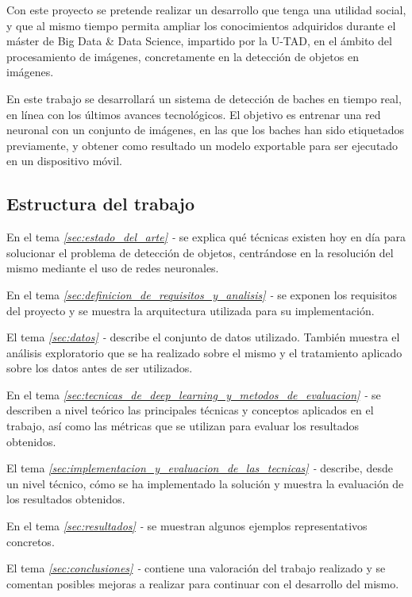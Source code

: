 Con este proyecto se pretende realizar un desarrollo que tenga una utilidad social, y que al mismo tiempo permita ampliar los conocimientos adquiridos durante el máster de Big Data \& Data Science, impartido por la U-TAD, en el ámbito del procesamiento de imágenes, concretamente en la detección de objetos en imágenes.

En este trabajo se desarrollará un sistema de detección de baches en tiempo real, en línea con los últimos avances tecnológicos. El objetivo es entrenar una red neuronal con un conjunto de imágenes, en las que los baches han sido etiquetados previamente, y obtener como resultado un modelo exportable para ser ejecutado en un dispositivo móvil.

\subsection{Estructura del trabajo}

En el tema \textit{\ref{sec:estado_del_arte} - } se explica qué técnicas existen hoy en día para solucionar el problema de detección de objetos, centrándose en la resolución del mismo mediante el uso de redes neuronales.

En el tema \textit{\ref{sec:definicion_de_requisitos_y_analisis} - } se exponen los requisitos del proyecto y se muestra la arquitectura utilizada para su implementación.

El tema \textit{\ref{sec:datos} - } describe el conjunto de datos utilizado. También muestra el análisis exploratorio que se ha realizado sobre el mismo y el tratamiento aplicado sobre los datos antes de ser utilizados.

En el tema \textit{\ref{sec:tecnicas_de_deep_learning_y_metodos_de_evaluacion} - } se describen a nivel teórico las principales técnicas y conceptos aplicados en el trabajo, así como las métricas que se utilizan para evaluar los resultados obtenidos.

El tema \textit{\ref{sec:implementacion_y_evaluacion_de_las_tecnicas} - } describe, desde un nivel técnico, cómo se ha implementado la solución y muestra la evaluación de los resultados obtenidos.

En el tema \textit{\ref{sec:resultados} - } se muestran algunos ejemplos representativos concretos.

El tema \textit{\ref{sec:conclusiones} - } contiene una valoración del trabajo realizado y se comentan posibles mejoras a realizar para continuar con el desarrollo del mismo.